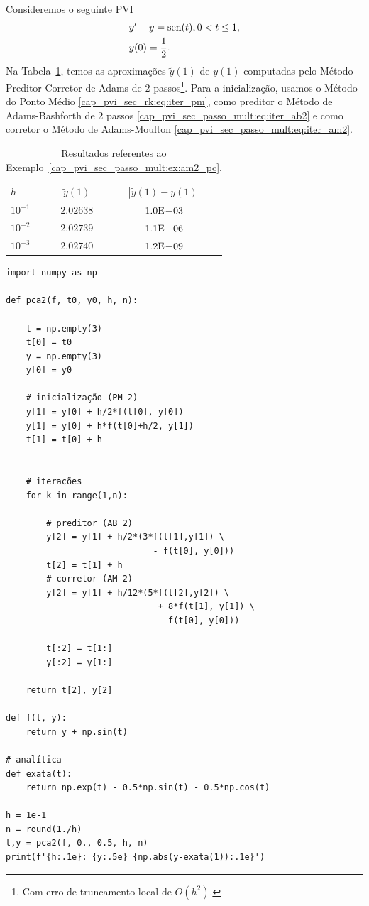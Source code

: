 \begin{ex}\label{cap_pvi_sec_passo_mult:ex:am2_pc}
  Consideremos o seguinte PVI
  \begin{subequations}
    \begin{align}
      &y' - y = \operatorname{sen}(t), 0 < t \leq 1,\\
      &y(0) = \frac{1}{2}.
    \end{align}
  \end{subequations}
  Na Tabela~\ref{cap_pvi_sec_passo_mult:tab:ex_am2_pc}, temos as aproximações $\tilde{y}(1)$ de $y(1)$ computadas pelo Método Preditor-Corretor de Adams de $2$ passos\footnote{Com erro de truncamento local de $O(h^2)$.}. Para a inicialização, usamos o Método do Ponto Médio \ref{cap_pvi_sec_rk:eq:iter_pm}, como preditor o Método de Adams-Bashforth de 2 passos \eqref{cap_pvi_sec_passo_mult:eq:iter_ab2} e como corretor o Método de Adams-Moulton \eqref{cap_pvi_sec_passo_mult:eq:iter_am2}.
 
  \begin{table}[H]
    \centering
    \caption{Resultados referentes ao Exemplo~\ref{cap_pvi_sec_passo_mult:ex:am2_pc}.}
    \begin{tabular}{l|cc}
      $h$ & $\tilde{y}(1)$ & $|\tilde{y}(1)-y(1)|$\\\hline
      $10^{-1}$ & $2.02638$ & $1.0\mathrm{E}\!-\!03$ \\
      $10^{-2}$ & $2.02739$ & $1.1\mathrm{E}\!-\!06$ \\
      $10^{-3}$ & $2.02740$ & $1.2\mathrm{E}\!-\!09$ \\\hline
   \end{tabular}
    \label{cap_pvi_sec_passo_mult:tab:ex_am2_pc}
  \end{table}

\begin{lstlisting}[caption = pca2.py]
import numpy as np

def pca2(f, t0, y0, h, n):

    t = np.empty(3)
    t[0] = t0
    y = np.empty(3)
    y[0] = y0

    # inicialização (PM 2)
    y[1] = y[0] + h/2*f(t[0], y[0])
    y[1] = y[0] + h*f(t[0]+h/2, y[1])
    t[1] = t[0] + h

    
    # iterações
    for k in range(1,n):
        
        # preditor (AB 2)
        y[2] = y[1] + h/2*(3*f(t[1],y[1]) \
                             - f(t[0], y[0]))
        t[2] = t[1] + h
        # corretor (AM 2)
        y[2] = y[1] + h/12*(5*f(t[2],y[2]) \
                              + 8*f(t[1], y[1]) \
                              - f(t[0], y[0]))
        
        t[:2] = t[1:]
        y[:2] = y[1:]
        
    return t[2], y[2]

def f(t, y):
    return y + np.sin(t)

# analítica
def exata(t):
    return np.exp(t) - 0.5*np.sin(t) - 0.5*np.cos(t)

h = 1e-1
n = round(1./h)
t,y = pca2(f, 0., 0.5, h, n)
print(f'{h:.1e}: {y:.5e} {np.abs(y-exata(1)):.1e}')
\end{lstlisting}
\end{ex}

